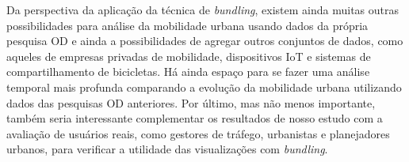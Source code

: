 Da perspectiva da aplicação da técnica de \emph{bundling}, existem ainda muitas
outras possibilidades para análise da mobilidade urbana usando dados da própria
pesquisa OD e ainda a possibilidades de agregar outros conjuntos de dados, como
aqueles de empresas privadas de mobilidade, dispositivos IoT e sistemas de
compartilhamento de bicicletas. Há ainda espaço para se fazer uma análise
temporal mais profunda comparando a evolução da mobilidade urbana utilizando
dados das pesquisas OD anteriores. Por último, mas não menos importante, também
seria interessante complementar os resultados de nosso estudo com a avaliação de
usuários reais, como gestores de tráfego, urbanistas e planejadores urbanos,
para verificar a utilidade das visualizações com \emph{bundling}.






